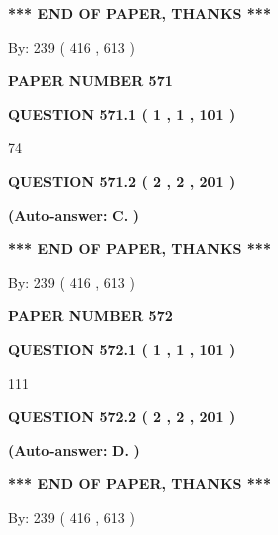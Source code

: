 \documentclass{ctexart}
\begin{document}
 
   
   
   
   
\vspace{1.0in} 
{\textbf{\large{ *** END OF PAPER, THANKS *** }}} 
   
   
\hspace{1.0in} By: 
 239 ( 416 ,  613 )
   
   
   
   
\newpage 
\setcounter{page}{ 
   571001 } 
   
   
 {\textbf{ \Large{ PAPER NUMBER  571  }}}
   
   
   
   
  
  
{\textbf{\large{QUESTION
571.1 
 ( 1 , 1 , 101 )
}}}

74
  
  
{\textbf{\large{QUESTION
571.2 
 ( 2 , 2 , 201 )
}}}
 
 
{\textbf{(Auto-answer:}}
{\textbf{\large{
C.}}}
{\textbf{)}}
 
 
   
   
   
   
\vspace{1.0in} 
{\textbf{\large{ *** END OF PAPER, THANKS *** }}} 
   
   
\hspace{1.0in} By: 
 239 ( 416 ,  613 )
   
   
   
   
\newpage 
\setcounter{page}{ 
   572001 } 
   
   
 {\textbf{ \Large{ PAPER NUMBER  572  }}}
   
   
   
   
  
  
{\textbf{\large{QUESTION
572.1 
 ( 1 , 1 , 101 )
}}}

111
  
  
{\textbf{\large{QUESTION
572.2 
 ( 2 , 2 , 201 )
}}}
 
 
{\textbf{(Auto-answer:}}
{\textbf{\large{
D.}}}
{\textbf{)}}
 
 
   
   
   
   
\vspace{1.0in} 
{\textbf{\large{ *** END OF PAPER, THANKS *** }}} 
   
   
\hspace{1.0in} By: 
 239 ( 416 ,  613 )
   
   
   
   
\newpage 
\setcounter{page}{ 
   573001 } 
   
\end{document}
